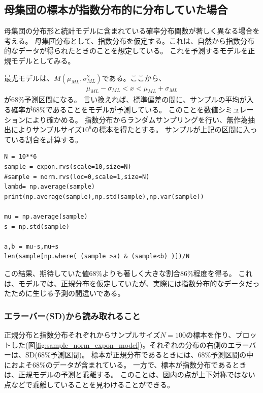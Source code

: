 \subsection{母集団の標本が指数分布的に分布していた場合}
母集団の分布形と統計モデルに含まれている確率分布関数が著しく異なる場合を考える。
母集団分布として、指数分布を仮定する。これは、自然から指数分布的なデータが得られたときのことを想定している。
これを予測するモデルを正規モデルとしてみる。

最尤モデルは、$M(\mu_{ML},\sigma^2_{ML})$である。ここから、
\begin{eqnarray*}
    \mu_{ML}-\sigma_{ML} < x < \mu_{ML}+\sigma_{ML}
\end{eqnarray*}
が$68\%$予測区間になる。
言い換えれば、標準偏差の間に、サンプルの平均が入る確率が$68\%$であることをモデルが予測している。
このことを数値シミュレーションにより確かめる。
指数分布からランダムサンプリングを行い、無作為抽出によりサンプルサイズ$10^6$の標本を得たとする。
サンプルが上記の区間に入っている割合を計算する。

\begin{lstlisting}
N = 10**6
sample = expon.rvs(scale=10,size=N)
#sample = norm.rvs(loc=0,scale=1,size=N)
lambd= np.average(sample)
print(np.average(sample),np.std(sample),np.var(sample))

mu = np.average(sample)
s = np.std(sample)

a,b = mu-s,mu+s
len(sample[np.where( (sample >a) & (sample<b) )])/N
\end{lstlisting}
この結果、期待していた値$68\%$よりも著しく大きな割合$86\%$程度を得る。
これは、モデルでは、正規分布を仮定していたが、実際には指数分布的なデータだったために生じる予測の間違いである。

\subsubsection{エラーバー(SD)から読み取れること}
正規分布と指数分布それぞれからサンプルサイズ$N=100$の標本を作り、プロットした(図\ref{fig:sample_norm_expon_model})。それぞれの分布の右側のエラーバーは、SD($68\%$予測区間)。
標本が正規分布であるときには、$68\%$予測区間の中におよそ$68\%$のデータが含まれている。
一方で、標本が指数分布であるときは、正規モデルの予測と乖離する。
このことは、図内の点が上下対称ではない点などで乖離していることを見わけることができる。

